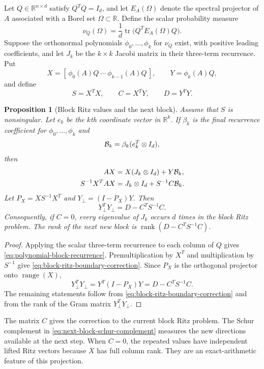 \documentclass[11pt]{article}
\newtheorem{proposition}{Proposition}
\theoremstyle{definition}
\newcommand{\R}{\mathbb{R}}
\begin{document}
Let $Q\in\R^{n\times d}$ satisfy $Q^TQ=I_d$, and let $E_A(\Omega)$ denote
the spectral projector of $A$ associated with a Borel set $\Omega\subset\R$.
Define the scalar probability measure
\[
 \nu_Q(\Omega)=\frac{1}{d}\operatorname{tr}
 \bigl(Q^TE_A(\Omega)Q\bigr).
\]
Suppose the orthonormal polynomials $\phi_0,\ldots,\phi_k$ for $\nu_Q$
exist, with positive leading coefficients, and let
$J_k$ be the $k\times k$ Jacobi matrix in their three-term recurrence.  Put
\[
 X=[\,\phi_0(A)Q\ \cdots\ \phi_{k-1}(A)Q\,],
 \qquad Y=\phi_k(A)Q,
\]
and define
\[
 S=X^TX,
 \qquad C=X^TY,
 \qquad D=Y^TY.
\]

\begin{proposition}[Block Ritz values and the next block]
\label{prop:exact-clusters-deflation}
Assume that $S$ is nonsingular.  Let $e_k$ be the $k$th coordinate vector in
$\R^k$.  If $\beta_k$ is the final recurrence coefficient for
$\phi_0,\ldots,\phi_k$ and
\[
 {\cal B}_k=\beta_k(e_k^T\otimes I_d),
\]
then
\begin{align}
 AX&=X(J_k\otimes I_d)+Y{\cal B}_k,
 \label{eq:polynomial-block-recurrence}\\
 S^{-1}X^TAX
 &=J_k\otimes I_d+S^{-1}C{\cal B}_k.
 \label{eq:block-ritz-boundary-correction}
\end{align}
Let $P_X=XS^{-1}X^T$ and $Y_\perp=(I-P_X)Y$.  Then
\begin{equation}
 Y_\perp^TY_\perp=D-C^TS^{-1}C.
 \label{eq:next-block-schur-complement}
\end{equation}
Consequently, if $C=0$, every eigenvalue of $J_k$ occurs $d$ times in the
block Ritz problem.  The rank of the next new block is
$\operatorname{rank}(D-C^TS^{-1}C)$.
\end{proposition}

\begin{proof}
Applying the scalar three-term recurrence to each column of $Q$ gives
\eqref{eq:polynomial-block-recurrence}.  Premultiplication by $X^T$ and
multiplication by $S^{-1}$ give
\eqref{eq:block-ritz-boundary-correction}.  Since $P_X$ is the orthogonal
projector onto $\operatorname{range}(X)$,
\[
 Y_\perp^TY_\perp
 =Y^T(I-P_X)Y=D-C^TS^{-1}C.
\]
The remaining statements follow from
\eqref{eq:block-ritz-boundary-correction} and from the rank of the Gram
matrix $Y_\perp^TY_\perp$.
\end{proof}

The matrix $C$ gives the correction to the current block Ritz problem.
The Schur complement in \eqref{eq:next-block-schur-complement} measures the
new directions available at the next step.  When $C=0$, the repeated
values have independent lifted Ritz vectors because $X$ has full column
rank.  They are an exact-arithmetic feature of this projection.
\end{document}
